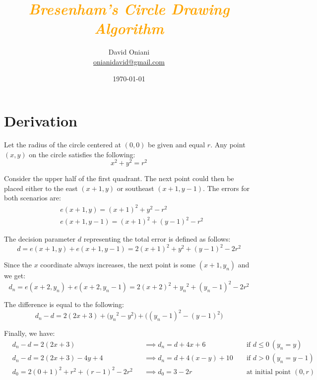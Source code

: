 \documentclass{article}
\author{David Oniani\\
        \href{mailto:onianidavid@gmail.com}{onianidavid@gmail.com}}
\title{\textcolor{orange}{\textit{Bresenham's Circle Drawing Algorithm}}}
\date{\today}
\begin{document}
\maketitle


\section{Derivation}

Let the radius of the circle centered at \((0, 0)\) be given and equal \(r\). Any point \((x, y)\)
on the circle satisfies the following:
\begin{equation}
    x^2 + y^2 = r^2
\end{equation}

Consider the upper half of the first quadrant. The next point could then be placed either to the
east \((x + 1, y)\) or southeast \((x + 1, y - 1)\). The errors for both scenarios are:
\begin{align}
    &e(x + 1, y) = {(x + 1)}^2 + y^2 - r^2\\
    &e(x + 1, y - 1) = {(x + 1)}^2 + {(y - 1)}^2 - r^2
\end{align}

The decision parameter \(d\) representing the total error is defined as follows:
\begin{equation}
    d = e(x + 1, y) + e(x + 1, y - 1)
      = 2{(x + 1)}^2 + y^2 + {(y - 1)}^2 - 2r^2
\end{equation}

Since the \(x\) coordinate always increases, the next point is some \((x + 1, y_n)\) and we get:
\begin{equation}
    d_n = e(x + 2, y_n) + e(x + 2, y_n - 1)
        = 2{(x + 2)}^2 + {y_n}^2 + {(y_n - 1)}^2 - 2r^2
\end{equation}

The difference is equal to the following:
\begin{equation}
    d_n - d = 2(2x + 3) + \big({y_n}^2 - y^2\big) + \big({(y_n - 1)}^2 - {(y - 1)}^2\big)
\end{equation}

Finally, we have:
\begin{align}
    &d_n - d = 2(2x + 3) &&\implies d_n
             = d + 4x + 6 &&\text{ if } d \leq 0\ (y_n = y)\\
    &d_n - d = 2(2x + 3) - 4y + 4 &&\implies d_n
             = d + 4(x - y) + 10 &&\text{ if } d > 0\ (y_n = y - 1)\\
    &d_0 = 2{(0 + 1)}^2 + r^2 + {(r - 1)}^2 - 2r^2 &&\implies d_0
         = 3 - 2r &&\text{ at initial point } (0, r)
\end{align}
\end{document}
